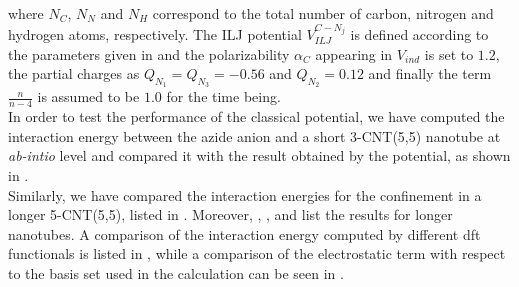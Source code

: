 \documentclass[utf8]{article}
\begin{document}
%
where $N_C$, $N_N$ and $N_H$ correspond to the total number of carbon, nitrogen and hydrogen atoms, respectively.
The ILJ potential $V_{ILJ}^{C-N_j}$ is defined according to the parameters given in  and the polarizability $\alpha_C$ appearing in $V_{ind}$ is set to $1.2$, the partial charges as $Q_{N_1} = Q_{N_3} = -0.56$ and $Q_{N_2} = 0.12$ and finally the term $\tfrac{n}{n - 4}$ is assumed to be $1.0$ for the time being.\\
In order to test the performance of the classical potential, we have computed the interaction energy between the azide anion and a short 3-CNT(5,5) nanotube at \textit{ab-intio} level and compared it with the result obtained by the potential, as shown in .\\
Similarly, we have compared the interaction energies for the confinement in a longer 5-CNT(5,5), listed in .
Moreover, , ,  and  list the results for longer nanotubes.
A comparison of the interaction energy computed by different dft functionals is listed in , while a comparison of the electrostatic term with respect to the basis set used in the calculation can be seen in .
\end{document}
